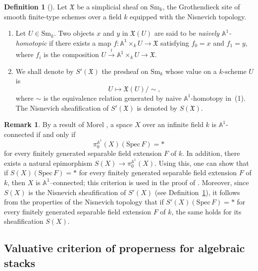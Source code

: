 \documentclass[12pt,reqno]{amsart}
\newcommand{\mf}[1]{\mathfrak{#1}}
\newcommand{\bb}[1]{\mathbb{#1}}
\theoremstyle{definition}
\newtheorem{definition}[theorem]{Definition}
\newtheorem{remark}[theorem]{Remark}
\numberwithin{equation}{section}
\begin{document}
	\begin{definition}[]
		\label{def:naive-a1-homotopy}
		Let $\mf{X}$ be a simplicial sheaf on $\mathrm{Sm}_k$, the Grothendieck
		site of smooth finite-type schemes over a field $k$ equipped with the
		Nisnevich topology.
		\begin{enumerate}[(1)]
			\item Let $U\in \mathrm{Sm}_k$. Two objects $x$ and $y$ in $\mf{X}(U)$
			are said to be \textit{naively $\bb{A}^1$-homotopic} if there exists a
			map $f: \bb{A}^1\times_k U \rightarrow \mf{X}$ satisfying $f_0 = x$ and
			$f_1 = y$, where $f_i$ is the composition
			$U\xrightarrow{i}\bb{A}^1\times_k U \rightarrow \mf{X}$.
			\item We shall denote by $S'(\mf{X})$ the presheaf on $\mathrm{Sm}_k$
			whose value on a $k$-scheme $U$ is
			\[
			U\mapsto \mf{X}(U)/{\sim},
			\]
			where $\sim$ is the equivalence relation generated by naive
			$\bb{A}^1$-homotopy in~(1). The Nisnevich sheafification of $S'(\mf{X})$
			is denoted by $S(\mf{X})$.
		\end{enumerate}
	\end{definition}
	
	\begin{remark}\label{remark:a1-connected-condition}
		By a result of Morel \cite[Lemma~6.1.3]{M05}, a space $X$ over an infinite
		field $k$ is $\bb{A}^1$-connected if and only if
		\[
		\pi^{\bb{A}^1}_0(X)(\mathrm{Spec}\,F) = *
		\]
		for every finitely generated separable field extension $F$ of $k$. In
		addition, there exists a natural epimorphism $S(X) \to \pi^{\bb{A}^1}_0(X)$.
		Using this, one can show that if $S(X)(\mathrm{Spec}\,F) = *$ for every
		finitely generated separable field extension $F$ of $k$, then $X$ is
		$\bb{A}^1$--connected; this criterion is used in the proof of
		\cite[Theorem~1.1]{HY24}. Moreover, since $S(X)$ is the Nisnevich
		sheafification of $S'(X)$ (see Definition~\ref{def:naive-a1-homotopy}), it
		follows from the properties of the Nisnevich topology that if
		$S'(X)(\mathrm{Spec}\,F) = *$ for every finitely generated separable field
		extension $F$ of $k$, the same holds for its sheafification $S(X)$.
	\end{remark}
	
	\subsection{Valuative criterion of properness for algebraic stacks}
	\label{subsection:valuative-criterion}
	
\end{document}
